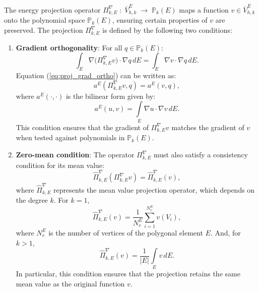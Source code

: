 \documentclass{article}
\begin{document}
The energy projection operator $\Pi^{\nabla}_{k,E}\;:\;\overline{V}^{E}_{h,k}\;\longrightarrow\;\mathbb{P}_{k}(E)$ maps a function $v \in \overline{V}_{h,k}^E$ onto the polynomial space $\mathbb{P}_k(E)$, ensuring certain properties of $v$ are preserved. The projection $\Pi^{\nabla}_{k,E}$ is defined by the following two conditions:
\begin{enumerate}
    \item \textbf{Gradient orthogonality}: For all $q\in \mathbb{P}_k(E)$:
    \begin{equation}\label{eq:proj_grad_ortho}
        \int_{E}\nabla\bigl(\Pi^{\nabla}_{k,E} v\bigr)\cdot\nabla q\,dE=\int_{E}\nabla v\cdot\nabla q\,dE.
    \end{equation}
    Equation (\ref{eq:proj_grad_ortho}) can be written as:
    \begin{equation}\label{eq:proj_grad_ortho_v2}
        a^E(\Pi^{\nabla}_{k,E} v, q) = a^E(v, q),
    \end{equation}
    where $a^E(\cdot, \cdot)$ is the bilinear form given by:
    \begin{equation}\label{eq:bilinear_form}
        a^E(u, v) = \int \limits_E \nabla u \cdot \nabla v\,dE.
    \end{equation}
    This condition ensures that the gradient of $\Pi^{\nabla}_{k,E} v$ matches the gradient of $v$ when tested against polynomials in $\mathbb{P}_k(E)$.
    \item \textbf{Zero-mean condition}: The operator $\Pi^{\nabla}_{k,E}$ must also satisfy a consistency condition for its mean value:
    \begin{equation}\label{eq:zero_mean_condition}
        \hat{\Pi}_{k,E}^\nabla (\Pi^{\nabla}_{k,E} v) = \hat{\Pi}_{k,E}^\nabla (v),
    \end{equation}
    where $\hat{\Pi}_{k,E}^\nabla$ represents the mean value projection operator, which depends on the degree $k$. For $k = 1$,
    \begin{equation}
    \nonumber
        \hat{\Pi}_{k,E}^\nabla(v) = \frac{1}{N^E_v} \sum \limits^{N^E_v}_{i=1} v(V_i),
    \end{equation}
    where $N^E_v$ is the number of vertices of the polygonal element $E$. And, for $k > 1$,
    \begin{equation}
    \nonumber
        \hat{\Pi}_{k,E}^\nabla(v) = \frac{1}{|E|} \int \limits_E v\, dE.
    \end{equation}
    In particular, this condition ensures that the projection retains the same mean value as the original function $v$. 
\end{enumerate}
\end{document}
